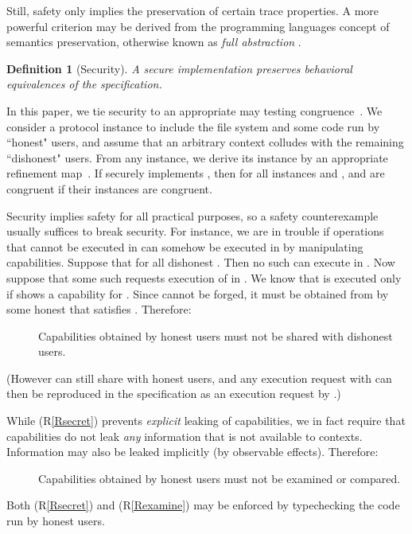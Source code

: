 \documentclass[10pt]{article}
\makeatletter
\newtheorem{definition}{Definition}
\newcounter{Crules}
\newcommand{\R}{\addtocounter{Crules}{1}R\arabic{Crules}\gdef\@currentlabel{\arabic{Crules}}}
\makeatother
\begin{document}
Still, safety only implies the preservation of certain trace properties. A more powerful criterion may be derived from the programming languages concept of semantics preservation, otherwise known as \emph{full abstraction} \cite{milnerfullabs,pplt}. 
\begin{definition}[Security]
A secure implementation preserves behavioral equivalences of the specification. 
\end{definition}
\noindent
In this paper, we tie security to an appropriate may testing congruence~\cite{nicohenn84}.  We consider a protocol instance to include the file system and some code run by ``honest" users, and assume that an arbitrary context colludes with the remaining ``dishonest" users. From any  instance, we derive its  instance by an appropriate refinement map~\cite{refmap}. If  securely implements , then for all  instances  and ,   and  are congruent if their  instances are congruent. 


Security implies safety for all practical purposes, so a safety counterexample usually suffices to break security. For instance, we are in trouble if operations that cannot be executed in  can somehow be executed in  by manipulating capabilities. Suppose that  for all dishonest . Then no such  can execute  in . Now suppose that some such  requests execution of  in . We know that  is executed only if  shows a capability  for . Since  cannot be forged, it must be obtained from  by some honest  that satisfies . Therefore:
\begin{description}
\item[\R]\label{Rsecret} Capabilities obtained by honest users must not be shared with dishonest users.
\end{description}
(However  can still share  with honest users, and any execution request with  can then be reproduced in the specification as an execution request by .)

While (R\ref{Rsecret}) prevents \emph{explicit} leaking of capabilities, we in fact require that capabilities do not leak \emph{any} information that is not available to  contexts. Information may also be leaked implicitly (by observable effects). Therefore:
\begin{description}
\item[\R]\label{Rexamine} Capabilities obtained by honest users must not be examined or compared. \end{description}
Both (R\ref{Rsecret}) and (R\ref{Rexamine}) may be enforced by typechecking the code run by honest users. 
\end{document}
